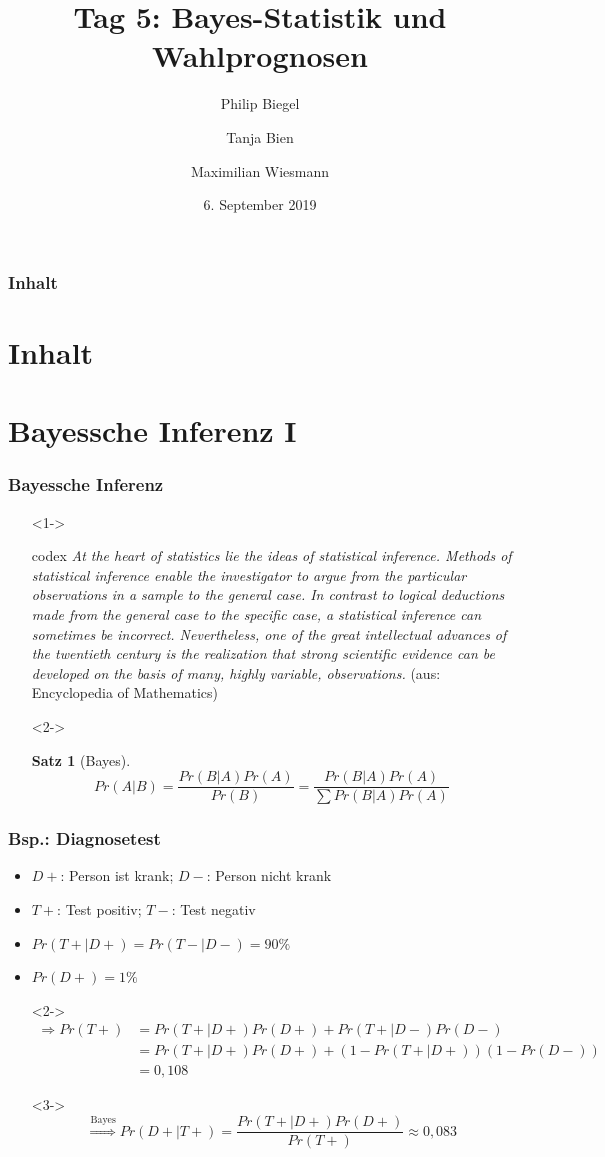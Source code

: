 \documentclass[aspectratio=169,xcolor=dvipsnames]{beamer}
\title[Bayes-Statistik \& Wahlprognosen]{\textbf{Tag 5: Bayes-Statistik und Wahlprognosen}}
\author[Philip \and Tanja \and Maximilian]{Philip Biegel \and Tanja Bien \and Maximilian Wiesmann}
\institute[]{Sommerakademie der Studienstiftung Olang - Arbeitsgruppe 4: Empirische Wahlforschung und Wahlprognosen}
\date{6. September 2019}
\newtheorem{satz}{Satz}
\begin{document}
\begin{frame}
\titlepage
\end{frame}

\begin{frame}
\frametitle{Inhalt}
\section[Inhalt]{Inhalt}
\end{frame}

\section{Bayessche Inferenz I}

\begin{frame}
\frametitle{Bayessche Inferenz}
\begin{itemize}
	\item[]<1-> 
	\begin{beamercolorbox}[sep=0.5em,wd=\textwidth,shadow=true,rounded=true]{codex}
		\textit{\glqq At the heart of statistics lie the ideas of statistical inference. Methods of statistical inference enable the investigator to argue from the particular observations in a sample to the general case. In contrast to logical deductions made from the general case to the specific case, a statistical inference can sometimes be incorrect. Nevertheless, one of the great intellectual advances of the twentieth century is the realization that strong scientific evidence can be developed on the basis of many, highly variable, observations.\grqq} (aus: Encyclopedia of Mathematics)
	\end{beamercolorbox}
	\item[]<2->
	\begin{satz}[Bayes]
		$$Pr(A|B) = \frac{Pr(B|A)Pr(A)}{Pr(B)} = \frac{Pr(B|A)Pr(A)}{\sum Pr(B|A)Pr(A)}$$
	\end{satz}
\end{itemize}
\end{frame}

\begin{frame}
\frametitle{Bsp.: Diagnosetest}
\begin{itemize}
	\item<1-> $D+$: Person ist krank; $D-$: Person nicht krank
	\item<1-> $T+$: Test positiv; $T-$: Test negativ
	\item<1-> $Pr(T+|D+)=Pr(T-|D-)=90\%$
	\item<1-> $Pr(D+)=1\%$
	\item[]<2-> \begin{align*}
				\Rightarrow Pr(T+) & = Pr(T+|D+)Pr(D+) + Pr(T+|D-)Pr(D-)\\ & = Pr(T+|D+)Pr(D+) + (1-Pr(T+|D+))(1-Pr(D-))\\ & = 0,108
			\end{align*}
	\item[]<3-> $$\overset{\text{Bayes}}{\Rightarrow} Pr(D+|T+) = \frac{Pr(T+|D+)Pr(D+)}{Pr(T+)}\approx 0,083$$
\end{itemize}
\end{frame}
\end{document}
